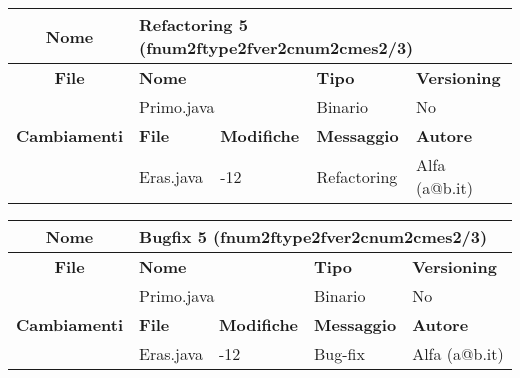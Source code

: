 \begin{table}[ht]
\footnotesize
\begin{tabular}{|c|p{2.5cm}|p{2cm}|p{2.5cm}|p{2.5cm}|}
  \hline
  \textbf{Nome}	& \multicolumn{4}{l|}{Refactoring 5 (fnum2ftype2fver2cnum2cmes2/3)} 									\\
  \hline
  \rowcolor{lightgray}\textbf{File} 		& \multicolumn{2}{l|}{\textbf{Nome}}		& \textbf{Tipo}		& \textbf{Versioning} 		\\
						\cline{2-5}
						& \multicolumn{2}{l|}{Primo.java}		& Binario		& No				\\
  \hline
  \rowcolor{lightgray}\textbf{Cambiamenti}	& \textbf{File}		&\textbf{Modifiche}	& \textbf{Messaggio}	& \textbf{Autore}		\\
						\cline{2-5}
						& Eras.java		& -12	 		& Refactoring		& Alfa (a@b.it)			\\
						
  \hline
\end{tabular}
\end{table}


\begin{table}[ht]
\footnotesize
\begin{tabular}{|c|p{2.5cm}|p{2cm}|p{2.5cm}|p{2.5cm}|}
  \hline
  \textbf{Nome}	& \multicolumn{4}{l|}{Bugfix 5 (fnum2ftype2fver2cnum2cmes2/3)} 										\\
  \hline
  \rowcolor{lightgray}\textbf{File} 		& \multicolumn{2}{l|}{\textbf{Nome}}		& \textbf{Tipo}		& \textbf{Versioning} 		\\
						\cline{2-5}
						& \multicolumn{2}{l|}{Primo.java}		& Binario		& No				\\
  \hline
  \rowcolor{lightgray}\textbf{Cambiamenti}	& \textbf{File}		&\textbf{Modifiche}	& \textbf{Messaggio}	& \textbf{Autore}		\\
						\cline{2-5}
						& Eras.java		& -12	 		& Bug-fix		& Alfa (a@b.it)			\\
						
  \hline
\end{tabular}
\end{table}

